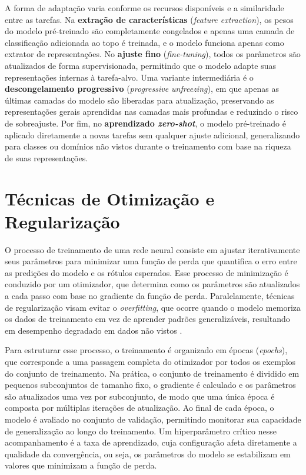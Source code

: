 A forma de adaptação varia conforme os recursos disponíveis e a similaridade entre as tarefas. Na \textbf{extração de características} (\textit{feature extraction}), os pesos do modelo pré-treinado são completamente congelados e apenas uma camada de classificação adicionada ao topo é treinada, e o modelo funciona apenas como extrator de representações. No \textbf{ajuste fino} (\textit{fine-tuning}), todos os parâmetros são atualizados de forma supervisionada, permitindo que o modelo adapte suas representações internas à tarefa-alvo. Uma variante intermediária é o \textbf{descongelamento progressivo} (\textit{progressive unfreezing}), em que apenas as últimas camadas do modelo são liberadas para atualização, preservando as representações gerais aprendidas nas camadas mais profundas e reduzindo o risco de sobreajuste. Por fim, no \textbf{aprendizado \textit{zero-shot}}, o modelo pré-treinado é aplicado diretamente a novas tarefas sem qualquer ajuste adicional, generalizando para classes ou domínios não vistos durante o treinamento com base na riqueza de suas representações.

\section{Técnicas de Otimização e Regularização} 
 
O processo de treinamento de uma rede neural consiste em ajustar
iterativamente seus parâmetros para minimizar uma função de perda
que quantifica o erro entre as predições do modelo e os rótulos esperados.
Esse processo de minimização é conduzido por um otimizador, que
determina como os parâmetros são atualizados a cada passo com base no
gradiente da função de perda. Paralelamente, técnicas
de regularização visam evitar o \textit{overfitting}, que
ocorre quando o modelo memoriza os dados de treinamento em vez de aprender
padrões generalizáveis, resultando em desempenho degradado em dados não
vistos \cite{goodfellow2016}.

Para estruturar esse processo, o treinamento é organizado em épocas (\textit{epochs}), que corresponde a uma passagem completa do otimizador por todos os exemplos do conjunto de treinamento. Na prática, o conjunto de treinamento é dividido em pequenos subconjuntos de tamanho fixo, o gradiente é calculado e os
parâmetros são atualizados uma vez por subconjunto, de modo que uma única
época é composta por múltiplas iterações de atualização. Ao final de cada
época, o modelo é avaliado no conjunto de validação, permitindo monitorar
sua capacidade de generalização ao longo do treinamento. Um hiperparâmetro
crítico nesse acompanhamento é a taxa de aprendizado, cuja configuração
afeta diretamente a qualidade da convergência, ou seja, os parâmetros do modelo se estabilizam em valores que minimizam a função de perda.

